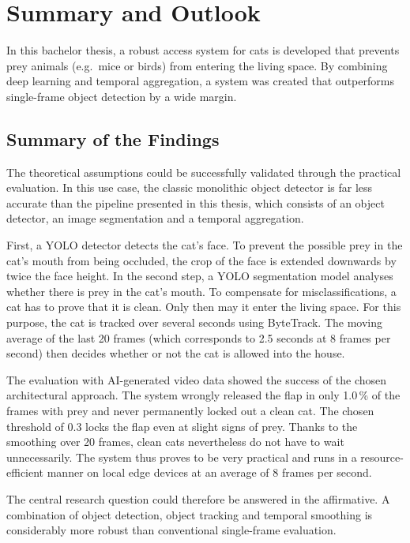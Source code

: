 \chapter{Summary and Outlook}
\label{sec:zusammenfassung}

In this bachelor thesis, a robust access system for cats is developed that prevents prey animals (e.g.\ mice or birds) from entering the living space. By combining deep learning and temporal aggregation, a system was created that outperforms single-frame object detection by a wide margin.

\section{Summary of the Findings}
\label{subsec:zusammenfassung_erkenntnisse}

The theoretical assumptions could be successfully validated through the practical evaluation. In this use case, the classic monolithic object detector is far less accurate than the pipeline presented in this thesis, which consists of an object detector, an image segmentation and a temporal aggregation.

First, a YOLO detector detects the cat's face. To prevent the possible prey in the cat's mouth from being occluded, the crop of the face is extended downwards by twice the face height. In the second step, a YOLO segmentation model analyses whether there is prey in the cat's mouth. To compensate for misclassifications, a cat has to prove that it is clean. Only then may it enter the living space. For this purpose, the cat is tracked over several seconds using ByteTrack. The moving average of the last 20 frames (which corresponds to 2.5 seconds at 8 frames per second) then decides whether or not the cat is allowed into the house.

The evaluation with AI-generated video data showed the success of the chosen architectural approach. The system wrongly released the flap in only 1.0\,\% of the frames with prey and never permanently locked out a clean cat. The chosen threshold of 0.3 locks the flap even at slight signs of prey. Thanks to the smoothing over 20 frames, clean cats nevertheless do not have to wait unnecessarily. The system thus proves to be very practical and runs in a resource-efficient manner on local edge devices at an average of 8 frames per second.

The central research question could therefore be answered in the affirmative. A combination of object detection, object tracking and temporal smoothing is considerably more robust than conventional single-frame evaluation.

